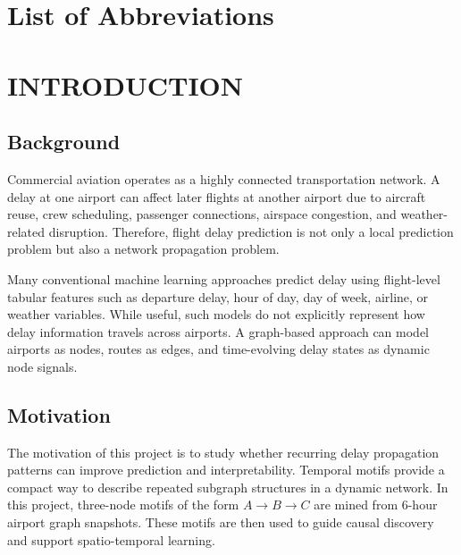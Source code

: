 \documentclass[12pt,a4paper]{report}
\begin{document}
\chapter*{List of Abbreviations}
\begin{acronym}[STGNN]
	\setlength{\itemsep}{-\parsep}
\end{acronym}

\chapter{INTRODUCTION}
\noindent{\rule{\textwidth}{1.5pt}}
\setcounter{page}{1}

\section{Background}
Commercial aviation operates as a highly connected transportation network. A delay at one airport can affect later flights at another airport due to aircraft reuse, crew scheduling, passenger connections, airspace congestion, and weather-related disruption. Therefore, flight delay prediction is not only a local prediction problem but also a network propagation problem.

Many conventional machine learning approaches predict delay using flight-level tabular features such as departure delay, hour of day, day of week, airline, or weather variables. While useful, such models do not explicitly represent how delay information travels across airports. A graph-based approach can model airports as nodes, routes as edges, and time-evolving delay states as dynamic node signals.

\section{Motivation}
The motivation of this project is to study whether recurring delay propagation patterns can improve prediction and interpretability. Temporal motifs provide a compact way to describe repeated subgraph structures in a dynamic network. In this project, three-node motifs of the form $A \rightarrow B \rightarrow C$ are mined from 6-hour airport graph snapshots. These motifs are then used to guide causal discovery and support spatio-temporal learning.
\end{document}
